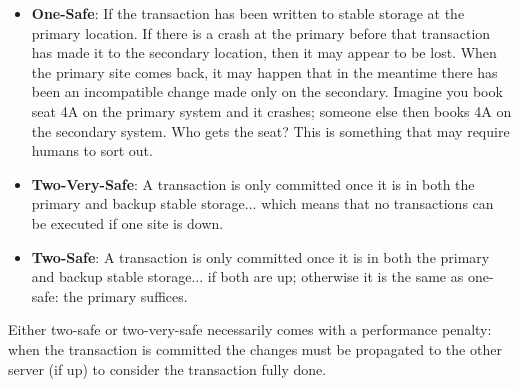 \begin{itemize}
	\item \textbf{One-Safe}: If the transaction has been written to stable storage at the primary location. If there is a crash at the primary before that transaction has made it to the secondary location, then it may appear to be lost. When the primary site comes back, it may happen that in the meantime there has been an incompatible change made only on the secondary. Imagine you book seat 4A on the primary system and it crashes; someone else then books 4A on the secondary system. Who gets the seat? This is something that may require humans to sort out.
	\item \textbf{Two-Very-Safe}: A transaction is only committed once it is in both the primary and backup stable storage... which means that no transactions can be executed if one site is down.
	\item \textbf{Two-Safe}: A transaction is only committed once it is in both the primary and backup stable storage... if both are up; otherwise it is the same as one-safe: the primary suffices. 
\end{itemize}

Either two-safe or two-very-safe necessarily comes with a performance penalty: when the transaction is committed the changes must be propagated to the other server (if up) to consider the transaction fully done.




